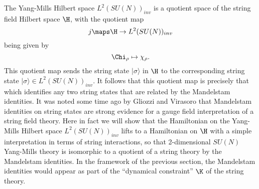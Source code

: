The Yang-Mills Hilbert space $L^2(SU(N))_{inv}$ is a quotient space of
the string field Hilbert space $\H$, with the quotient map
\[             j \maps \H \to L^2(SU(N))_{inv}  \]
being given by
\[             \Chi_\rho \mapsto \chi_\rho  .\]
This quotient map sends the string state $|\sigma\rangle$ in $\H$ to the
corresponding string state $|\sigma\rangle \in L^2(SU(N))_{inv}$.
It follows that this quotient map is precisely that which identifies any
two string states that are related by the Mandelstam identities.
It was noted some time ago by Gliozzi and Virasoro \cite{GV}
that Mandelstam identities on string states are strong
evidence for a gauge field interpretation of a string field theory.
Here in fact we will show that the Hamiltonian on the Yang-Mills
Hilbert space $L^2(SU(N))_{inv}$ lifts to a Hamiltonian on $\H$
with a simple interpretation in terms of string interactions, so that
2-dimensional $SU(N)$ Yang-Mills theory is isomorphic to a quotient of
a string theory by the Mandelstam identities.  In the framework of the
previous section, the Mandelstam identities would appear as part of the
``dynamical constraint'' $\K$ of the string theory.

